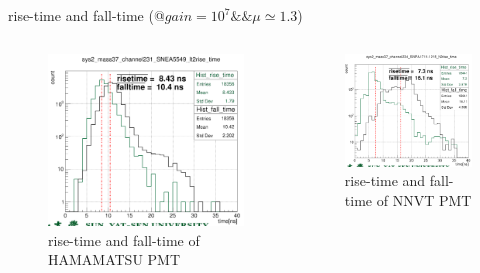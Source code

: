 \documentclass[11pt,compress,xcolor=x11names,UTF8]{beamer}
\begin{document}
\begin{frame}{rise-time and fall-time (@$gain=10^7\&\&\mu\simeq 1.3$)}
\begin{columns}
\begin{column}{.5\textwidth}
\begin{figure}
\centering
\includegraphics[width=\textwidth]{figures/hamrtft.png} %
\caption{rise-time and fall-time of HAMAMATSU PMT}
\end{figure}
\end{column}
\begin{column}{.5\textwidth}
\begin{figure}
\centering
\includegraphics[width=\textwidth]{figures/mcprtft.png} %
\caption{rise-time and fall-time of NNVT PMT}
\end{figure}
\end{column}
\end{columns}
\end{frame}
\end{document}
